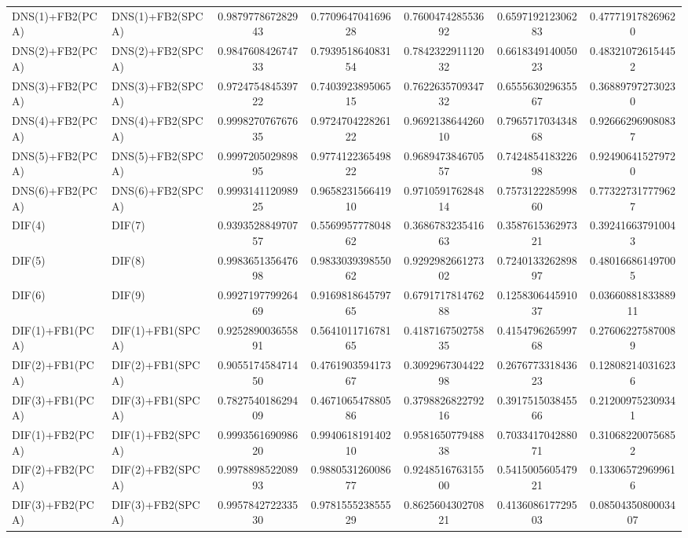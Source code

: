 \begin{table}[H]
\begin{tabular}{llSSSSS}
DNS(1)+FB2(PCA) & DNS(1)+FB2(SPCA) & 0.987977867282943 & 0.770964704169628 & 0.760047428553692 & 0.659719212306283 & 0.477719178269620 \\ 
DNS(2)+FB2(PCA) & DNS(2)+FB2(SPCA) & 0.984760842674733 & 0.793951864083154 & 0.784232291112032 & 0.661834914005023 & 0.483210726154452 \\ 
DNS(3)+FB2(PCA) & DNS(3)+FB2(SPCA) & 0.972475484539722 & 0.740392389506515 & 0.762263570934732 & 0.655563029635567 & 0.368897972730230 \\ 
DNS(4)+FB2(PCA) & DNS(4)+FB2(SPCA) & 0.999827076767635 & 0.972470422826122 & 0.969213864426010 & 0.796571703434868 & 0.926662969080837 \\ 
DNS(5)+FB2(PCA) & DNS(5)+FB2(SPCA) & 0.999720502989895 & 0.977412236549822 & 0.968947384670557 & 0.742485418322698 & 0.924906415279720 \\ 
DNS(6)+FB2(PCA) & DNS(6)+FB2(SPCA) & 0.999314112098925 & 0.965823156641910 & 0.971059176284814 & 0.757312228599860 & 0.773227317779627 \\ 
DIF(4) & DIF(7) & 0.939352884970757 & 0.556995777804862 & 0.368678323541663 & 0.358761536297321 & 0.392416637910043 \\ 
DIF(5) & DIF(8) & 0.998365135647698 & 0.983303939855062 & 0.929298266127302 & 0.724013326289897 & 0.480166861497005 \\ 
DIF(6) & DIF(9) & 0.992719779926469 & 0.916981864579765 & 0.679171781476288 & 0.125830644591037 & 0.0366088183388911 \\ 
DIF(1)+FB1(PCA) & DIF(1)+FB1(SPCA) & 0.925289003655891 & 0.564101171678165 & 0.418716750275835 & 0.415479626599768 & 0.276062275870089 \\ 
DIF(2)+FB1(PCA) & DIF(2)+FB1(SPCA) & 0.905517458471450 & 0.476190359417367 & 0.309296730442298 & 0.267677331843623 & 0.128082140316236 \\ 
DIF(3)+FB1(PCA) & DIF(3)+FB1(SPCA) & 0.782754018629409 & 0.467106547880586 & 0.379882682279216 & 0.391751503845566 & 0.212009752309341 \\ 
DIF(1)+FB2(PCA) & DIF(1)+FB2(SPCA) & 0.999356169098620 & 0.994061819140210 & 0.958165077948838 & 0.703341704288071 & 0.310682200756852 \\ 
DIF(2)+FB2(PCA) & DIF(2)+FB2(SPCA) & 0.997889852208993 & 0.988053126008677 & 0.924851676315500 & 0.541500560547921 & 0.133065729699616 \\ 
DIF(3)+FB2(PCA) & DIF(3)+FB2(SPCA) & 0.995784272233530 & 0.978155523855529 & 0.862560430270821 & 0.413608617729503 & 0.0850435080003407 \\ \bottomrule 
\end{tabular}
\end{table}



